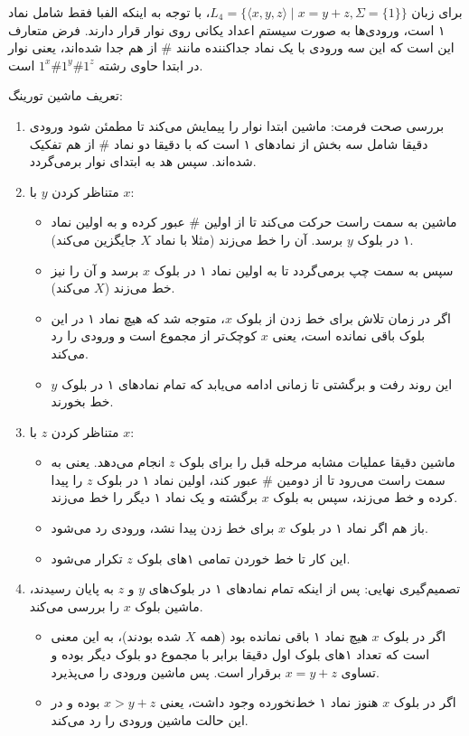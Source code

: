 برای زبان $L_4 = \{ \langle x, y, z \rangle \mid x = y + z, \Sigma = \{1\} \}$، با توجه به اینکه الفبا فقط شامل نماد ۱ است، ورودی‌ها به صورت سیستم اعداد یکانی روی نوار قرار دارند. فرض متعارف این است که این سه ورودی با یک نماد جداکننده مانند $\#$ از هم جدا شده‌اند، یعنی نوار در ابتدا حاوی رشته $1^x \# 1^y \# 1^z$ است. 

تعریف ماشین تورینگ:

\begin{enumerate}
    \item {بررسی صحت فرمت:} ماشین ابتدا نوار را پیمایش می‌کند تا مطمئن شود ورودی دقیقا شامل سه بخش از نمادهای ۱ است که با دقیقا دو نماد $\#$ از هم تفکیک شده‌اند. سپس هد به ابتدای نوار برمی‌گردد.

    \item {متناظر کردن $y$ با $x$:} 
    \begin{itemize}
        \item ماشین به سمت راست حرکت می‌کند تا از اولین $\#$ عبور کرده و به اولین نماد ۱ در بلوک $y$ برسد. آن را خط می‌زند (مثلا با نماد $X$ جایگزین می‌کند).
        \item سپس به سمت چپ برمی‌گردد تا به اولین نماد ۱ در بلوک $x$ برسد و آن را نیز خط می‌زند ($X$ می‌کند). 
        \item اگر در زمان تلاش برای خط زدن از بلوک $x$، متوجه شد که هیچ نماد ۱ در این بلوک باقی نمانده است، یعنی $x$ کوچک‌تر از مجموع است و ورودی را رد می‌کند.
        \item این روند رفت و برگشتی تا زمانی ادامه می‌یابد که تمام نمادهای ۱ در بلوک $y$ خط بخورند.
    \end{itemize}

    \item {متناظر کردن $z$ با $x$:}
    \begin{itemize}
        \item ماشین دقیقا عملیات مشابه مرحله قبل را برای بلوک $z$ انجام می‌دهد. یعنی به سمت راست می‌رود تا از دومین $\#$ عبور کند، اولین نماد ۱ در بلوک $z$ را پیدا کرده و خط می‌زند، سپس به بلوک $x$ برگشته و یک نماد ۱ دیگر را خط می‌زند.
        \item باز هم اگر نماد ۱ در بلوک $x$ برای خط زدن پیدا نشد، ورودی رد می‌شود.
        \item این کار تا خط خوردن تمامی ۱های بلوک $z$ تکرار می‌شود.
    \end{itemize}

    \item {تصمیم‌گیری نهایی:} 
    پس از اینکه تمام نمادهای ۱ در بلوک‌های $y$ و $z$ به پایان رسیدند، ماشین بلوک $x$ را بررسی می‌کند.
    \begin{itemize}
        \item اگر در بلوک $x$ هیچ نماد ۱ باقی نمانده بود (همه $X$ شده بودند)، به این معنی است که تعداد ۱های بلوک اول دقیقا برابر با مجموع دو بلوک دیگر بوده و تساوی $x = y + z$ برقرار است. پس ماشین ورودی را می‌پذیرد.
        \item اگر در بلوک $x$ هنوز نماد ۱ خط‌نخورده وجود داشت، یعنی $x > y + z$ بوده و در این حالت ماشین ورودی را رد می‌کند.
    \end{itemize}
\end{enumerate}


